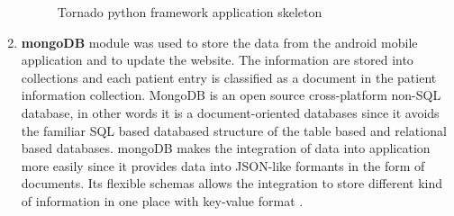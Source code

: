 \begin{enumerate}
\begin{figure}[H]
\caption{Tornado python framework application skeleton}
\label{fig:fig-eg}
\end{figure}
	\item {\bfseries mongoDB} module was used to store the data from the android mobile application and to update the website. The information are stored into collections and each patient entry is classified as a document in the patient information collection. MongoDB is an open source cross-platform non-SQL database, in other words it is a document-oriented databases since it avoids the familiar SQL based databased structure of the table based and relational based databases. mongoDB makes the integration of data into application more easily since it provides data into JSON-like formants in the form of documents. Its flexible schemas allows the integration to store different kind of information in one place with key-value format \cite{mongodb2016}.
\end{enumerate}
